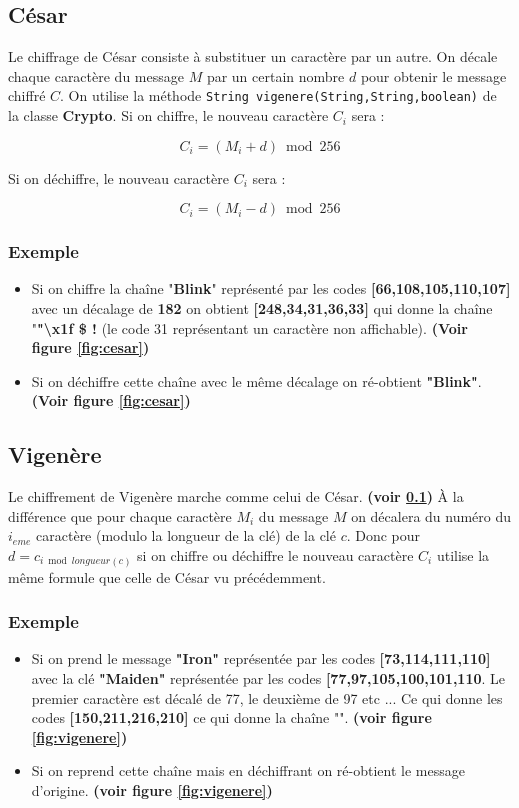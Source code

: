 \documentclass{article}
\begin{document}
\subsection{César}\label{cesar}

Le chiffrage de César consiste à substituer un caractère par un autre. On décale chaque caractère du message $M$ par un certain nombre \textbf{$d$} pour obtenir le message chiffré $C$. On utilise la méthode \verb+String vigenere(String,String,boolean)+ de la classe \textbf{Crypto}.
Si on chiffre, le nouveau caractère \textbf{$C_{i}$} sera :

\[C_{i} = (M_{i}+d) \bmod 256 \]


Si on déchiffre, le nouveau caractère $C_{i}$ sera :

\[C_{i} = (M_{i}-d) \bmod 256 \]


\subsubsection{Exemple}
\begin{itemize}
\item Si on chiffre la chaîne "\textbf{Blink}" représenté par les codes \textbf{[66,108,105,110,107]} avec un décalage de \textbf{182} on obtient \textbf{[248,34,31,36,33]} qui donne la chaîne "\textbf{"\textbackslash x1f \$ !} (le code 31 représentant un caractère non affichable). \textbf{(Voir figure \ref{fig:cesar})}
\item Si on déchiffre cette chaîne avec le même décalage on ré-obtient \textbf{"Blink"}. \textbf{(Voir figure \ref{fig:cesar})}
\end{itemize}

\subsection{Vigenère}

Le chiffrement de Vigenère marche comme celui de César. \textbf{(voir \ref{cesar})} À la différence que pour chaque caractère $M_{i}$ du message $M$ on décalera du numéro du $i_{eme}$ caractère (modulo la longueur de la clé) de la clé $c$.
Donc pour $d = c_{i \bmod longueur(c)}$ si on chiffre ou déchiffre le nouveau caractère $C_{i}$ utilise la même formule que celle de César vu précédemment.
\subsubsection{Exemple}
\begin{itemize}
\item Si on prend le message \textbf{"Iron"} représentée par les codes \textbf{[73,114,111,110]}  avec la clé \textbf{"Maiden"} représentée par les codes \textbf{[77,97,105,100,101,110}. Le premier caractère est décalé de 77, le deuxième de 97 etc ... Ce qui donne les codes \textbf{[150,211,216,210]} ce qui donne la chaîne "". \textbf{(voir figure \ref{fig:vigenere})}
\item Si on reprend cette chaîne mais en déchiffrant on ré-obtient le message d'origine. \textbf{(voir figure \ref{fig:vigenere})}
\end{itemize}
\end{document}
